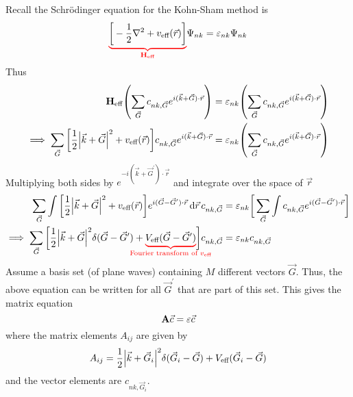 \documentclass[12pt,a4paper,titlepage]{article}
\newcommand{\trm}[1]{\textrm{#1}} %
\begin{document}
Recall the Schr\"{o}dinger equation for the Kohn-Sham method is
\begin{equation}
{\color{red}\underbrace{\color{black}\bigg[-\frac{1}{2}\nabla^{2}+v_{\trm{eff}}(\vec{r})\bigg]}_{\vb{H}_{\trm{eff}}}}\Psi_{nk}=\varepsilon_{nk}\Psi_{nk}
\end{equation}
Thus
\begin{equation}
\begin{aligned}
\vb{H}_{\trm{eff}}\qty(\sum_{\vec{G}}c_{nk,\vec{G}}e^{i(\vec{k}+\vec{G})\cdot\vec{r}})&=\varepsilon_{nk}\qty(\sum_{\vec{G}}c_{nk,\vec{G}}e^{i(\vec{k}+\vec{G})\cdot\vec{r}})\\
\implies \sum_{\vec{G}}\qty[\frac{1}{2}\abs{\vec{k}+\vec{G}}^{2}+v_{\trm{eff}}(\vec{r})]c_{nk,\vec{G}}e^{i(\vec{k}+\vec{G})\cdot\vec{r}}&=\varepsilon_{nk}\qty(\sum_{\vec{G}}c_{nk,\vec{G}}e^{i(\vec{k}+\vec{G})\cdot\vec{r}})
\end{aligned}
\end{equation}
Multiplying both sides by $e^{-i(\vec{k}+\vec{G}^{\prime})\cdot\vec{r}}$ and integrate over the space of $\vec{r}$
\begin{equation}
\begin{aligned}
\sum_{\vec{G}}\int\bigg[\frac{1}{2}\abs{\vec{k}+\vec{G}}^{2}+v_{\trm{eff}}(\vec{r})\bigg]e^{i(\vec{G}-\vec{G}^{\prime})\cdot\vec{r}}\dd{\vec{r}}c_{nk,\vec{G}}&=\varepsilon_{nk}\bigg[\sum_{\vec{G}}\int c_{nk,\vec{G}}e^{i(\vec{G}-\vec{G}^{\prime})\cdot\vec{r}}\bigg]\\
\implies\sum_{\vec{G}}\bigg[\frac{1}{2}\abs{\vec{k}+\vec{G}}^{2}\delta(\vec{G}-\vec{G}^{\prime})+{\color{red}\underbrace{\color{black}V_{\trm{eff}}(\vec{G}-\vec{G}^{\prime})}_{\mathclap{\trm{Fourier transform of $v_{\trm{eff}}$}}}}\bigg]c_{nk,\vec{G}}&=\varepsilon_{nk}c_{nk,\vec{G}}
\end{aligned}
\end{equation}
Assume a basis set (of plane waves) containing $M$ different vectors $\vec{G}$. Thus, the above equation can be written for all $\vec{G}^{\prime}$ that are part of this set. This gives the matrix equation
\begin{equation}
\vb{A}\vec{c}=\vb{\varepsilon}\vec{c}
\end{equation}
where the matrix elements $A_{ij}$ are given by
\begin{equation}
A_{ij}=\frac{1}{2}\abs{\vec{k}+\vec{G}_{i}}^{2}\delta(\vec{G}_{i}-\vec{G})+V_{\trm{eff}}(\vec{G}_{i}-\vec{G})
\end{equation}
and the vector elements are $c_{nk,\vec{G}_{i}}$.\\
\end{document}
